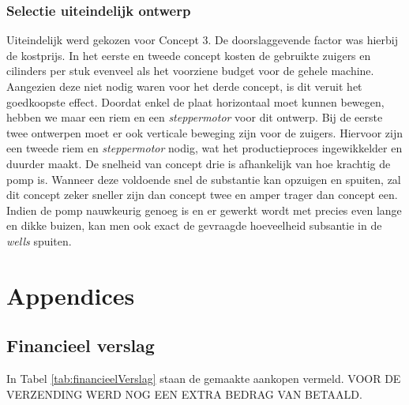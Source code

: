 \documentclass[a4paper,twoside,kulak]{kulakreport} %
\begin{document}
\subsection{Selectie uiteindelijk ontwerp}
Uiteindelijk werd gekozen voor Concept 3. De doorslaggevende factor was hierbij de kostprijs. In het eerste en tweede concept kosten de gebruikte zuigers en cilinders per stuk evenveel als het voorziene budget voor de gehele machine. Aangezien deze niet nodig waren voor het derde concept, is dit veruit het goedkoopste effect. Doordat enkel de plaat horizontaal moet kunnen bewegen, hebben we maar een riem en een \textit{steppermotor} voor dit ontwerp. Bij de eerste twee ontwerpen moet er ook verticale beweging zijn voor de zuigers. Hiervoor zijn een tweede riem en \textit{steppermotor} nodig, wat het productieproces ingewikkelder en duurder maakt. De snelheid van concept drie is afhankelijk van hoe krachtig de pomp is. Wanneer deze voldoende snel de substantie kan opzuigen en spuiten, zal dit concept zeker sneller zijn dan concept twee en amper trager dan concept een. Indien de pomp nauwkeurig genoeg is en er gewerkt wordt met precies even lange en dikke buizen, kan men ook exact de gevraagde hoeveelheid subsantie in de \textit{wells} spuiten. 





\chapter*{Appendices}
\section*{Financieel verslag}

In Tabel \ref{tab:financieelVerslag} staan de gemaakte aankopen vermeld. VOOR DE VERZENDING WERD NOG EEN EXTRA BEDRAG VAN    BETAALD.
\end{document}
